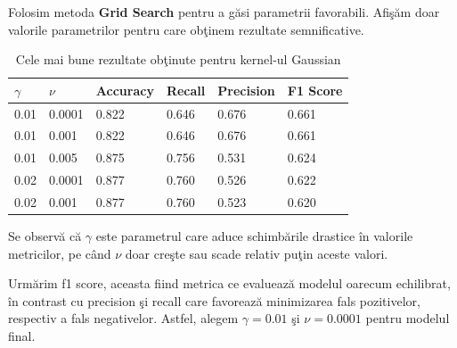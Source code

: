 Folosim metoda \textbf{Grid Search} pentru a găsi parametrii favorabili. Afişăm 
doar valorile parametrilor pentru care obţinem rezultate semnificative.

\begin{table}[H]
  \centering
  \begin{tabularx}{\textwidth}{
      |X
      |X
      |X
      |X
      |X
      |X|
  }
  \hline
  $\gamma$ & $\nu$ & {Accuracy} & {Recall} & {Precision} & {F1 Score} \\
  \hline
  \rowcolor{gray!20} 0.01 &  0.0001	&  0.822 &  0.646	&  0.676	&  0.661  \\
  0.01	&  0.001 &  0.822	&  0.646	&  0.676	&  0.661 \\
  \rowcolor{gray!20} 0.01 & 0.005 &  0.875 &  0.756	&  0.531	&  0.624  \\
  0.02 & 0.0001	& 0.877 &  0.760 &  0.526	&  0.622 \\
  \rowcolor{gray!20} 0.02 &  0.001	&  0.877 & 0.760 &  0.523	&  0.620 \\
  \hline
  \end{tabularx}
  \caption{Cele mai bune rezultate obţinute pentru kernel-ul Gaussian}
\end{table}

Se observă că $\gamma$ este parametrul care aduce schimbările drastice în valorile 
metricilor, pe când $\nu$ doar creşte sau scade relativ puţin aceste valori.

Urmărim f1 score, aceasta fiind metrica ce evaluează modelul oarecum 
echilibrat, în contrast cu precision şi recall care favorează minimizarea fals pozitivelor, 
respectiv a fals negativelor. Astfel, alegem $\gamma=0.01$ şi $\nu=0.0001$ pentru modelul final.

